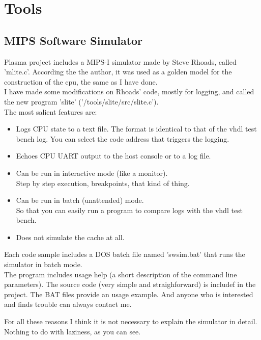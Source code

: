    
\chapter{Tools}
\label{tools}

\section{MIPS Software Simulator}
\label{sw_simulator}

    Plasma project includes a MIPS-I simulator made by Steve Rhoads, called
    'mlite.c'. According the the author, it was used as a golden model for the
    construction of the cpu, the same as I have done.\\
    I have made some modifications on Rhoads' code, mostly for logging, and
    called the new program 'slite' ('/tools/slite/src/slite.c').\\
    
    The most salient features are:
    
    \begin{itemize}
    \item Logs CPU state to a text file.
        The format is identical to that of the vhdl test bench log.
        You can select the code address that triggers the logging.
    \item Echoes CPU UART output to the host console or to a log file.
    \item Can be run in interactive mode (like a monitor).\\
        Step by step execution, breakpoints, that kind of thing.
    \item Can be run in batch (unattended) mode.\\
        So that you can easily run a program to compare logs with the 
        vhdl test bench.
    \item Does not simulate the cache at all.
    \end{itemize}
    
    Each code sample includes a DOS batch file named 'swsim.bat' that runs the
    simulator in batch mode.\\ 
    
    The program includes usage help (a short description of the command line 
    parameters). The source code (very simple and straighforward) is includef in
    the project. The BAT files provide an usage example. And anyone who is 
    interested and finds trouble can always contact me.
    
    For all these reasons I think it is not necessary to explain the simulator 
    in detail. Nothing to do with laziness, as you can see.\\
    
